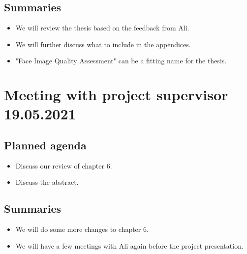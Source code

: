 \subsection*{Summaries}
\begin{itemize}
    \item We will review the thesis based on the feedback from Ali.
    \item We will further discuss what to include in the appendices.
    \item "Face Image Quality Assessment" can be a fitting name for the thesis.
\end{itemize}


\section*{Meeting with project supervisor 19.05.2021}
\subsection*{Planned agenda}
\begin{itemize}
    \item Discuss our review of chapter 6.
    \item Discuss the abstract.
\end{itemize}

\subsection*{Summaries}
\begin{itemize}
    \item We will do some more changes to chapter 6.
    \item We will have a few meetings with Ali again before the project presentation.
\end{itemize}